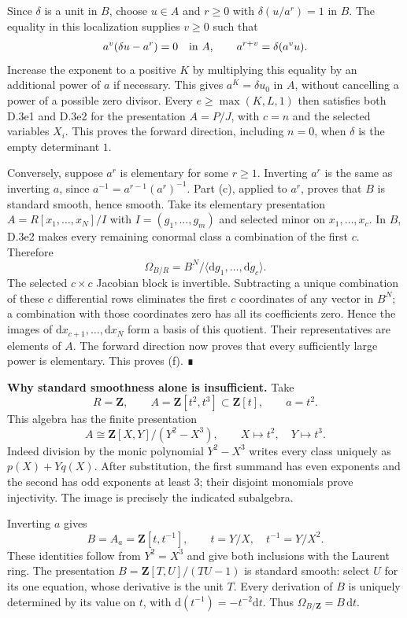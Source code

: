 \documentclass[11pt,a4paper,openany]{report}
\begin{document}
Since \(\delta\) is a unit in \(B\), choose \(u\in A\) and \(r\ge0\) with \(\delta(u/a^r)=1\) in \(B\). The equality in this localization supplies \(v\ge0\) such that \[a^v(\delta u-a^r)=0\quad\hbox{in }A,
\qquad a^{r+v}=\delta(a^v u).\] Increase the exponent to a positive \(K\) by multiplying this equality by an additional power of \(a\) if necessary. This gives \(a^K=\delta u_0\) in \(A\), without cancelling a power of a possible zero divisor. Every \(e\ge\max(K,L,1)\) then satisfies both D.3e1 and D.3e2 for the presentation \(A=P/J\), with \(c=n\) and the selected variables \(X_i\). This proves the forward direction, including \(n=0\), when \(\delta\) is the empty determinant \(1\).

Conversely, suppose \(a^r\) is elementary for some \(r\ge1\). Inverting \(a^r\) is the same as inverting \(a\), since \(a^{-1}=a^{r-1}(a^r)^{-1}\). Part (c), applied to \(a^r\), proves that \(B\) is standard smooth, hence smooth. Take its elementary presentation \(A=R[x_1,\ldots,x_N]/I\) with \(I=(g_1,\ldots,g_m)\) and selected minor on \(x_1,\ldots,x_c\). In \(B\), D.3e2 makes every remaining conormal class a combination of the first \(c\). Therefore \[\Omega_{B/R}=B^N/\langle\mathrm dg_1,\ldots,\mathrm dg_c\rangle.\] The selected \(c\times c\) Jacobian block is invertible. Subtracting a unique combination of these \(c\) differential rows eliminates the first \(c\) coordinates of any vector in \(B^N\); a combination with those coordinates zero has all its coefficients zero. Hence the images of \(\mathrm dx_{c+1},\ldots,\mathrm dx_N\) form a basis of this quotient. Their representatives are elements of \(A\). The forward direction now proves that every sufficiently large power is elementary. This proves (f). ∎

\textbf{Why standard smoothness alone is insufficient.} Take \[R=\mathbf Z,\qquad A=\mathbf Z[t^2,t^3]\subset\mathbf Z[t],\qquad a=t^2.\] This algebra has the finite presentation \[A\cong\mathbf Z[X,Y]/(Y^2-X^3),\qquad X\longmapsto t^2,\quad Y\longmapsto t^3.\] Indeed division by the monic polynomial \(Y^2-X^3\) writes every class uniquely as \(p(X)+Yq(X)\). After substitution, the first summand has even exponents and the second has odd exponents at least \(3\); their disjoint monomials prove injectivity. The image is precisely the indicated subalgebra.

Inverting \(a\) gives \[B=A_a=\mathbf Z[t,t^{-1}],\qquad t=Y/X,\quad t^{-1}=Y/X^2.\] These identities follow from \(Y^2=X^3\) and give both inclusions with the Laurent ring. The presentation \(B=\mathbf Z[T,U]/(TU-1)\) is standard smooth: select \(U\) for its one equation, whose derivative is the unit \(T\). Every derivation of \(B\) is uniquely determined by its value on \(t\), with \(\mathrm d(t^{-1})=-t^{-2}\mathrm dt\). Thus \(\Omega_{B/\mathbf Z}=B\,\mathrm dt\).
\end{document}
